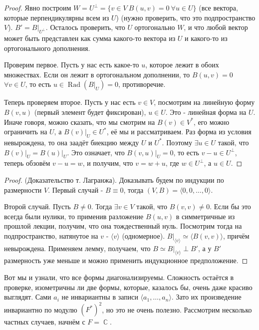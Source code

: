 \documentclass[a4paper,100pt]{article}
\theoremstyle{indented}
\theoremstyle{definition}
\theoremstyle{remark}
\DeclareMathOperator{\CC}{\mathbb{C}}
\DeclareMathOperator{\Rad}{Rad}
\begin{document}
\begin{proof}
    Явно построим $W=U^{\perp}= \{v\in V \: B(u, v)=0 \: \forall u\in U\}$ (все вектора, которые перпендикулярны всем из $U$) (нужно проверить, что это подпространство $V$). $B'=B\bigg|_{U^{\perp}}$. Осталось проверить, что $U$ ортогонально $W$, и что любой вектор может быть представлен как сумма какого-то вектора из $U$ и какого-то из ортогонального дополнения. \ 

    Проверим первое. Пусть у нас есть какое-то $u$, которое лежит в обоих множествах. Если он лежит в ортогональном дополнении, то $B(u, v)=0$ $\forall v\in U$, то есть $u\in \Rad(B\bigg|_U)=0$, противоречие. \ 

    Теперь проверяем второе. Пусть у нас есть $v\in V$, посмотрим на линейную форму $B(v, u)$ (первый элемент будет фиксирован), $u\in U$. Это - линейная форма на $U$. Иначе говоря, можно сказать, что мы смотрим на $B(v)\in V^*$, его можно ограничить на $U$, а $B(v)\bigg|_U\in U^*$, её мы и рассматриваем. Раз форма из условия невырождена, то она заадёт биекцию между $U$ и $U^*$. Поэтому $\exists u \in U$ такой, что $B(v)\bigg|_U=B(u)\bigg|_U$. Это означает, что $B(v, u)\bigg|_U=0$, то есть $v-u\in U^{\perp}$, теперь обзовём $v-u=w$, и получим, что $v=w+u$, где $w\in U^\perp$, а $u\in U$.
\end{proof}

\begin{proof}
    (Доказательство т. Лагранжа). Доказывать будем по индукции по размерности $V$. Первый случай - $B\equiv 0$, тогда $(V, B)=\langle 0, 0, \ldots, 0 \rangle$. \ 

    Второй случай. Пусть $B\neq 0$. Тогда $\exists v\in V$ такой, что $B(v, v)\neq 0$. Если бы это всегда были нулики, то применив разложение $B(u, v)$ в симметричные из прошлой лекции, получим, что она тождественный нуль. Посмотрим тогда на подпространство, натянутое на $v$ - $\langle v \rangle$ (одномерное). $B\bigg|_{\langle v \rangle}\simeq \langle B(v, v)\rangle$, причём невырождена. Применяем лемму, получаем, что $B\simeq B\bigg|_{\langle v\rangle}\perp B'$, а у $B'$ размерность уже меньше и можно применить индукционное предположение. 
\end{proof}

Вот мы и узнали, что все формы диагонализируемы. Сложность остаётся в проверке, изометричны ли две формы, которые, казалось бы, очень даже красиво выглядят. Сами $a_i$ не инвариантны в записи $\langle a_1, \ldots, a_n \rangle$. Зато их произведение инвариантно по модулю $(F^*)^2$, но это не очень полезно. Рассмотрим несколько частных случаев, начнём с $F=\CC$. \ 
\end{document}
